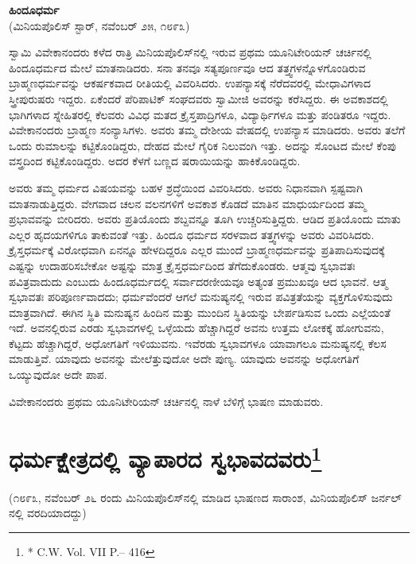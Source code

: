 \delimiter

\begin{center}
\textbf{ಹಿಂದೂಧರ್ಮ}\\ (ಮಿನಿಯಪೊಲಿಸ್​ ಸ್ಟಾರ್​, ನವೆಂಬರ್​ ೨೫, ೧೮೯೩)
\end{center}

ಸ್ವಾಮಿ ವಿವೇಕಾನಂದರು ಕಳೆದ ರಾತ್ರಿ ಮಿನಿಯಪೊಲಿಸ್​ನಲ್ಲಿ ಇರುವ ಪ್ರಥಮ ಯೂನಿಟೇರಿಯನ್​ ಚರ್ಚಿನಲ್ಲಿ ಹಿಂದೂಧರ್ಮದ ಮೇಲೆ ಮಾತನಾಡಿದರು. ಸನಾ ತನವೂ ಸತ್ಯಪೂರ್ಣವೂ ಆದ ತತ್ತ್ವಗಳನ್ನೊಳಗೊಂಡಿರುವ ಬ್ರಾಹ್ಮಣಧರ್ಮವನ್ನು ಆಕರ್ಷಕವಾದ ರೀತಿಯಲ್ಲಿ ವಿವರಿಸಿದರು. ಉಪನ್ಯಾಸಕ್ಕೆ ನೆರೆದವರಲ್ಲಿ ಮೇಧಾವಿಗಳಾದ ಸ್ತ್ರೀಪುರುಷರು ಇದ್ದರು. ಏಕೆಂದರೆ ಪೆರಿಪಾಟಿಕ್​ ಸಂಘದವರು ಸ್ವಾಮೀಜಿ ಅವರನ್ನು ಕರೆಸಿದ್ದರು. ಈ ಅವಕಾಶದಲ್ಲಿ ಭಾಗಿಗಳಾದ ಸ್ನೇಹಿತರಲ್ಲಿ ಕೆಲವರು ವಿವಿಧ ಮತದ ಕ್ರೈಸ್ತಪಾದ್ರಿಗಳೂ, ವಿದ್ಯಾರ್ಥಿಗಳೂ ಮತ್ತು ಪಂಡಿತರೂ ಇದ್ದರು. ವಿವೇಕಾನಂದರು ಬ್ರಾಹ್ಮಣ ಸಂನ್ಯಾಸಿಗಳು. ಅವರು ತಮ್ಮ ದೇಶೀಯ ವೇಷದಲ್ಲಿ ಉಪನ್ಯಾಸ ಮಾಡಿದರು. ಅವರು ತಲೆಗೆ ಒಂದು ರುಮಾಲನ್ನು ಕಟ್ಟಿಕೊಂಡಿದ್ದರು, ದೇಹದ ಮೇಲೆ ಗೈರಿಕ ನಿಲುವಂಗಿ ಇತ್ತು. ಅದನ್ನು ಸೊಂಟದ ಮೇಲೆ ಕೆಂಪು ವಸ್ತ್ರದಿಂದ ಕಟ್ಟಿಕೊಂಡಿದ್ದರು. ಅದರ ಕೆಳಗೆ ಬಣ್ಣದ ಷರಾಯಿಯನ್ನು ಹಾಕಿಕೊಂಡಿದ್ದರು.

ಅವರು ತಮ್ಮ ಧರ್ಮದ ವಿಷಯವನ್ನು ಬಹಳ ಶ್ರದ್ಧೆಯಿಂದ ವಿವರಿಸಿದರು. ಅವರು ನಿಧಾನವಾಗಿ ಸ್ಪಷ್ಟವಾಗಿ ಮಾತನಾಡುತ್ತಿದ್ದರು. ವೇಗವಾದ ಚಲನ ವಲನಗಳಿಗೆ ಅವಕಾಶ ಕೊಡದೆ ಮಾತಿನ ಮಾಧುರ್ಯದಿಂದ ತಮ್ಮ ಪ್ರಭಾವವನ್ನು ಬೀರಿದರು. ಅವರು ಪ್ರತಿಯೊಂದು ಶಬ್ದವನ್ನೂ ತೂಗಿ ಉಚ್ಚರಿಸುತ್ತಿದ್ದರು. ಆಡಿದ ಪ್ರತಿಯೊಂದು ಮಾತು ಎಲ್ಲರ ಹೃದಯಗಳಿಗೂ ತಾಕುವಂತೆ ಇತ್ತು. ಹಿಂದೂ ಧರ್ಮದ ಸರಳವಾದ ತತ್ತ್ವಗಳನ್ನು ಅವರು ವಿವರಿಸಿದರು. ಕ್ರೈಸ್ತಧರ್ಮಕ್ಕೆ ವಿರೋಧವಾಗಿ ಏನನ್ನೂ ಹೇಳದಿದ್ದರೂ ಎಲ್ಲರ ಮುಂದೆ ಬ್ರಾಹ್ಮಣಧರ್ಮವನ್ನು ಪ್ರತಿಪಾದಿಸುವುದಕ್ಕೆ ಎಷ್ಟನ್ನು ಉದಾಹರಿಸಬೇಕೋ ಅಷ್ಟನ್ನು ಮಾತ್ರ ಕ್ರೈಸ್ತಧರ್ಮದಿಂದ ತೆಗೆದುಕೊಂಡರು. ಆತ್ಮವು ಸ್ವಭಾವತಃ ಪವಿತ್ರವಾದುದು ಎಂಬುದು ಹಿಂದೂಧರ್ಮದಲ್ಲಿ ಸರ್ವಾದರಣೀಯವೂ ಅತ್ಯಂತ ಪ್ರಮುಖವೂ ಆದ ಭಾವನೆ. ಆತ್ಮ ಸ್ವಭಾವತಃ ಪರಿಪೂರ್ಣವಾದದು; ಧರ್ಮವೆಂದರೆ ಆಗಲೆ ಮನುಷ್ಯನಲ್ಲಿ ಇರುವ ಪವಿತ್ರತೆಯನ್ನು ವ್ಯಕ್ತಗೊಳಿಸುವುದು ಮಾತ್ರವಾಗಿದೆ. ಈಗಿನ ಸ್ಥಿತಿ ಮನುಷ್ಯನ ಹಿಂದಿನ ಮತ್ತು ಮುಂದಿನ ಸ್ಥಿತಿಯನ್ನು ಬೇರ್ಪಡಿಸುವ ಒಂದು ಎಲ್ಲೆಯಂತೆ ಇದೆ. ಅವನಲ್ಲಿರುವ ಎರಡು ಸ್ವಭಾವಗಳಲ್ಲಿ ಒಳ್ಳೆಯದು ಹೆಚ್ಚಾಗಿದ್ದರೆ ಅವನು ಉತ್ತಮ ಲೋಕಕ್ಕೆ ಹೋಗುವನು, ಕೆಟ್ಟದು ಹೆಚ್ಚಾಗಿದ್ದರೆ, ಅಧೋಗತಿಗೆ ಇಳಿಯುವನು. ಇವೆರಡು ಸ್ವಭಾವ\break ಗಳೂ ಯಾವಾಗಲೂ ಮನುಷ್ಯನಲ್ಲಿ ಕೆಲಸ ಮಾಡುತ್ತಿವೆ. ಯಾವುದು ಅವನನ್ನು ಮೇಲೆತ್ತು\break ವುದೋ ಅದೇ ಪುಣ್ಯ. ಯಾವುದು ಅವನನ್ನು ಅಧೋಗತಿಗೆ ಒಯ್ಯುವುದೋ ಅದೇ ಪಾಪ.

ವಿವೇಕಾನಂದರು ಪ್ರಥಮ ಯೂನಿಟೇರಿಯನ್​ ಚರ್ಚಿನಲ್ಲಿ ನಾಳೆ ಬೆಳಿಗ್ಗೆ ಭಾಷಣ ಮಾಡುವರು.

\delimiter

\section[ಧರ್ಮಕ್ಷೇತ್ರದಲ್ಲಿ ವ್ಯಾಪಾರದ ಸ್ವಭಾವದವರು]{ಧರ್ಮಕ್ಷೇತ್ರದಲ್ಲಿ ವ್ಯಾಪಾರದ ಸ್ವಭಾವದವರು\protect\footnote{* C.W. Vol. VII P.– 416}}

\begin{center}
(೧೮೯೩, ನವೆಂಬರ್​ ೨೬ ರಂದು ಮಿನಿಯಪೊಲಿಸ್​ನಲ್ಲಿ ಮಾಡಿದ ಭಾಷಣದ ಸಾರಾಂಶ, ಮಿನಿಯಪೊಲಿಸ್​ ಜರ್ನಲ್​ನಲ್ಲಿ ವರದಿಯಾದದ್ದು)
\end{center}


